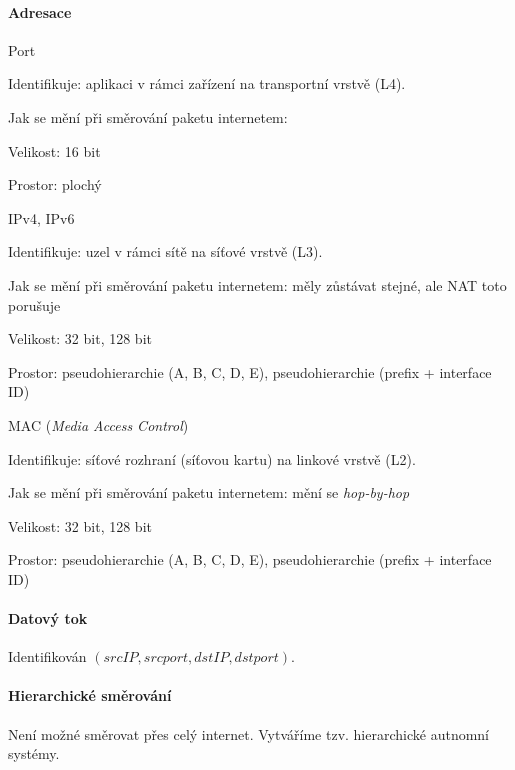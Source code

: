 \paragraph*{Adresace} \begin{compactitem}
    \item Port \begin{compactitem}
        \item Identifikuje: aplikaci v rámci zařízení na transportní vrstvě (L4).
        \item Jak se mění při směrování paketu internetem: 
        \item Velikost: 16 bit
        \item Prostor: plochý
    \end{compactitem}
    \item IPv4, IPv6 \begin{compactitem}
        \item Identifikuje: uzel v rámci sítě na síťové vrstvě (L3).
        \item Jak se mění při směrování paketu internetem: měly zůstávat stejné, ale NAT toto porušuje
        \item Velikost: 32 bit, 128 bit
        \item Prostor: pseudohierarchie (A, B, C, D, E), pseudohierarchie (prefix + interface ID)
    \end{compactitem}
    \item MAC (\textit{Media Access Control}) \begin{compactitem}
        \item Identifikuje: síťové rozhraní (síťovou kartu) na linkové vrstvě (L2).
        \item Jak se mění při směrování paketu internetem: mění se \textit{hop-by-hop}
        \item Velikost: 32 bit, 128 bit
        \item Prostor: pseudohierarchie (A, B, C, D, E), pseudohierarchie (prefix + interface ID)
    \end{compactitem}
\end{compactitem}

\paragraph*{Datový tok} Identifikován $(src IP, src port, dst IP, dst port)$.

\paragraph*{Hierarchické směrování} Není možné směrovat přes celý internet. Vytváříme tzv. hierarchické autnomní systémy.

